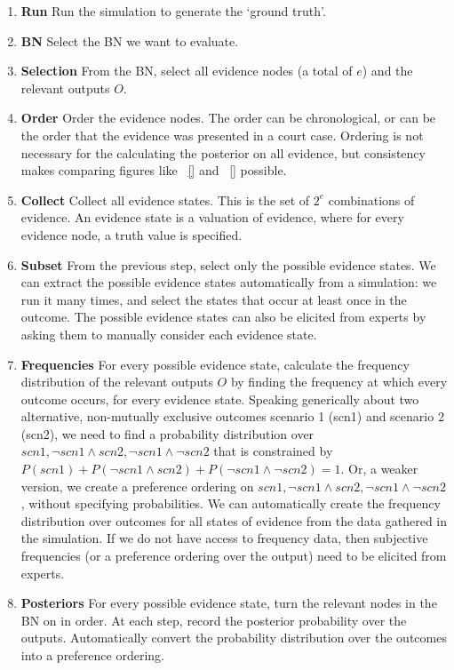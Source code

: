 \documentclass[12pt]{article}
\begin{document}
\begin{enumerate}
\item \textbf{Run} Run the simulation to generate the `ground truth'. 
\item \textbf{BN} Select the BN we want to evaluate.
\item \textbf{Selection} From the BN, select all evidence nodes (a total of $e$) and the relevant outputs $O$.
\item \textbf{Order} Order the evidence nodes. The order can be chronological, or can be the order that the evidence was presented in a court case. Ordering is not necessary for the calculating the posterior on all evidence, but consistency makes comparing figures like ~\ref{} and ~\ref{} possible.
\item \textbf{Collect} Collect all evidence states. This is the set of $2^e$ combinations of evidence. An evidence state is a valuation of evidence, where for every evidence node, a truth value is specified. 
\item \textbf{Subset} From the previous step, select only the possible evidence states. We can extract the possible evidence states automatically from a simulation: we run it many times, and select the states that occur at least once in the outcome. The possible evidence states can also be elicited from experts by asking them to manually consider each evidence state.
\item \textbf{Frequencies} For every possible evidence state, calculate the frequency distribution of the relevant outputs $O$ by finding the frequency at which every outcome occurs, for every evidence state. Speaking generically about two alternative, non-mutually exclusive outcomes scenario 1 (scn1) and scenario 2 (scn2), we need to find a probability distribution over $scn1, \neg scn1 \land scn2, \neg scn1 \land \neg scn2$ that is constrained by $P(scn1) + P(\neg scn1 \land scn2) + P(\neg scn1 \land \neg scn2) = 1$. Or, a weaker version, we create a preference ordering on $scn1, \neg scn1 \land scn2, \neg scn1 \land \neg scn2$, without specifying probabilities. 
We can automatically create the frequency distribution over outcomes for all states of evidence from the data gathered in the simulation. If we do not have access to frequency data, then subjective frequencies (or a preference ordering over the output) need to be elicited from experts.
\item \textbf{Posteriors} For every possible evidence state, turn the relevant nodes in the BN on in order. At each step, record the posterior probability over the outputs. Automatically convert the probability distribution over the outcomes into a preference ordering.

\end{enumerate}
\end{document}

